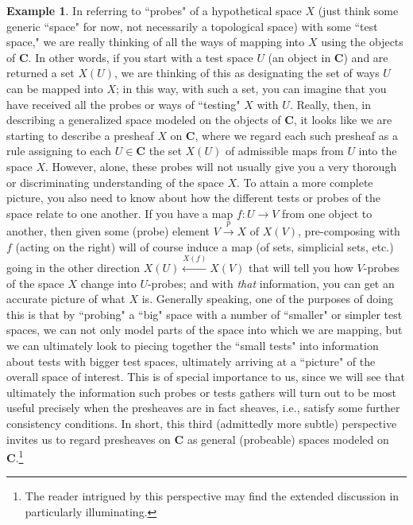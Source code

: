 \documentclass[a4paper]{book}
\theoremstyle{definition}
\newtheorem{example}{Example}[section]
\theoremstyle{definition}
\theoremstyle{definition}
\theoremstyle{theorem}
\theoremstyle{definition}
\begin{document}
\begin{example}
	In referring to ``probes" of a hypothetical space $X$ (just think some generic ``space" for now, not necessarily a topological space) with some ``test space," we are really thinking of all the ways of mapping into $X$ using the objects of \textbf{C}. In other words, if you start with a test space $U$ (an object in \textbf{C}) and are returned a set $X(U)$, we are thinking of this as designating the set of ways $U$ can be mapped into $X$; in this way, with such a set, you can imagine that you have received all the probes or ways of ``testing" $X$ with $U$. Really, then, in describing a generalized space modeled on the objects of \textbf{C}, it looks like we are starting to describe a presheaf $X$ on \textbf{C}, where we regard each such presheaf as a rule assigning to each $U \in \textbf{C}$ the set $X(U)$ of admissible maps from $U$ into the space $X$. However, alone, these probes will not usually give you a very thorough or discriminating understanding of the space $X$. To attain a more complete picture, you also need to know about how the different tests or probes of the space relate to one another. If you have a map $f: U \rightarrow V$ from one object to another, then given some (probe) element $V \xrightarrow{p} X$ of $X(V)$, pre-composing with $f$ (acting on the right) will of course induce a map (of sets, simplicial sets, etc.) going in the other direction $X(U) \xleftarrow{X(f)} X(V)$ that will tell you how $V$-probes of the space $X$ change into $U$-probes; and with \textit{that} information, you can get an accurate picture of what $X$ is. Generally speaking, one of the purposes of doing this is that by ``probing" a ``big" space with a number of ``smaller" or simpler test spaces, we can not only model parts of the space into which we are mapping, but we can ultimately look to piecing together the ``small tests" into information about tests with bigger test spaces, ultimately arriving at a ``picture" of the overall space of interest. This is of special importance to us, since we will see that ultimately the information such probes or tests gathers will turn out to be most useful precisely when the presheaves are in fact sheaves, i.e., satisfy some further consistency conditions. In short, this third (admittedly more subtle) perspective invites us to regard presheaves on \textbf{C} as general (probeable) spaces modeled on \textbf{C}.\footnote{The reader intrigued by this perspective may find the extended discussion in \cite{nlab_authors_motivation_2019} particularly illuminating.}              
	\end{example}
\end{document}

